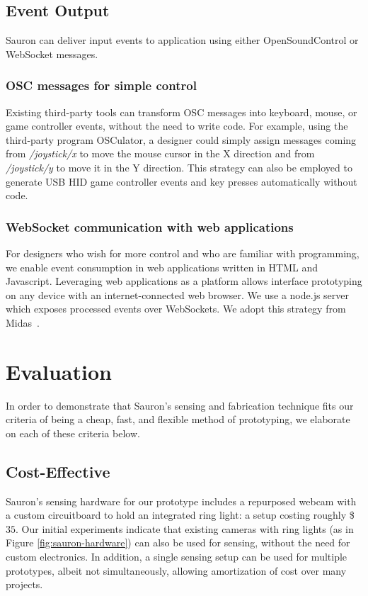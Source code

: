 \subsection{Event Output}
Sauron can deliver input events to application using either OpenSoundControl or WebSocket messages.

\subsubsection{OSC messages for simple control}

Existing third-party tools can transform OSC messages into keyboard, mouse, or game controller events, without the need to write code. For example, using the third-party program OSCulator, a designer could simply assign messages coming from {\em /joystick/x} to move the mouse cursor in the X direction and from {\em /joystick/y} to move it in the Y direction. This strategy can also be employed to generate USB HID game controller events and key presses automatically without code.

\subsubsection{WebSocket communication with web applications}

For designers who wish for more control and who are familiar with programming, we enable event consumption in web applications written in HTML and Javascript. Leveraging web applications as a platform allows interface prototyping on any device with an internet-connected web browser. 
We use a node.js server which exposes processed events over WebSockets. We adopt this strategy from Midas~\cite{savage-midas}. 

\section{Evaluation}

In order to demonstrate that Sauron's sensing and fabrication technique fits our criteria of being a cheap, fast, and flexible method of prototyping, we elaborate on each of these criteria below.

    \subsection{Cost-Effective}
    
    Sauron's sensing hardware for our prototype includes a repurposed webcam with a custom circuitboard to hold an integrated ring light: a setup costing roughly \$$35$. Our initial experiments indicate that existing cameras with ring lights (as in Figure \ref{fig:sauron-hardware}) can also be used for sensing, without the need for custom electronics. In addition, a single sensing setup can be used for multiple prototypes, albeit not simultaneously, allowing amortization of cost over many projects.
    
